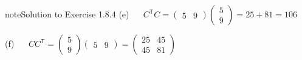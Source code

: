 \documentclass[letterpaper,10pt,english]{jupyterBook}
\begin{document}
\begin{sphinxadmonition}{note}{Solution to Exercise 1.8.4}
\sphinxAtStartPar
(e)   \(C^\mathsf{T}C = \begin{pmatrix} 5 & 9 \end{pmatrix} \begin{pmatrix} 5 \\ 9 \end{pmatrix} = 25 + 81 = 106\)

\sphinxAtStartPar
(f)   \(CC^\mathsf{T} = \begin{pmatrix} 5 \\ 9 \end{pmatrix}\begin{pmatrix} 5 & 9 \end{pmatrix} = \begin{pmatrix} 25 & 45 \\ 45 & 81 \end{pmatrix}\)


\end{sphinxadmonition}
\end{document}
